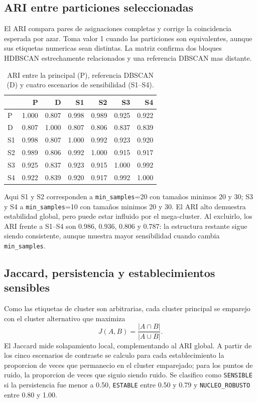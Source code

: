 \documentclass[11pt,letterpaper]{article}
\begin{document}
\subsection{ARI entre particiones seleccionadas}

El ARI compara pares de asignaciones completas y corrige la coincidencia esperada por azar. Toma valor 1 cuando las particiones son equivalentes, aunque sus etiquetas numericas sean distintas. La matriz confirma dos bloques HDBSCAN estrechamente relacionados y una referencia DBSCAN mas distante.

\begin{table}[H]
\centering
\small
\caption{ARI entre la principal (P), referencia DBSCAN (D) y cuatro escenarios de sensibilidad (S1--S4).}
\begin{tabular}{lrrrrrr}
\toprule
 & P & D & S1 & S2 & S3 & S4 \\
\midrule
P  & 1.000 & 0.807 & 0.998 & 0.989 & 0.925 & 0.922 \\
D  & 0.807 & 1.000 & 0.807 & 0.806 & 0.837 & 0.839 \\
S1 & 0.998 & 0.807 & 1.000 & 0.992 & 0.923 & 0.920 \\
S2 & 0.989 & 0.806 & 0.992 & 1.000 & 0.915 & 0.917 \\
S3 & 0.925 & 0.837 & 0.923 & 0.915 & 1.000 & 0.992 \\
S4 & 0.922 & 0.839 & 0.920 & 0.917 & 0.992 & 1.000 \\
\bottomrule
\end{tabular}
\end{table}

Aqui S1 y S2 corresponden a \texttt{min\_samples}=20 con tamaños minimos 20 y 30; S3 y S4 a \texttt{min\_samples}=10 con tamaños minimos 20 y 30. El ARI alto demuestra estabilidad global, pero puede estar influido por el mega-cluster. Al excluirlo, los ARI frente a S1--S4 son 0.986, 0.936, 0.806 y 0.787: la estructura restante sigue siendo consistente, aunque muestra mayor sensibilidad cuando cambia \texttt{min\_samples}.

\subsection{Jaccard, persistencia y establecimientos sensibles}

Como las etiquetas de cluster son arbitrarias, cada cluster principal se emparejo con el cluster alternativo que maximiza
\[
J(A,B)=\frac{|A\cap B|}{|A\cup B|}.
\]
El Jaccard mide solapamiento local, complementando al ARI global. A partir de los cinco escenarios de contraste se calculo para cada establecimiento la proporcion de veces que permanecio en el cluster emparejado; para los puntos de ruido, la proporcion de veces que siguio siendo ruido. Se clasifico como \texttt{SENSIBLE} si la persistencia fue menor a 0.50, \texttt{ESTABLE} entre 0.50 y 0.79 y \texttt{NUCLEO\_ROBUSTO} entre 0.80 y 1.00.
\end{document}

